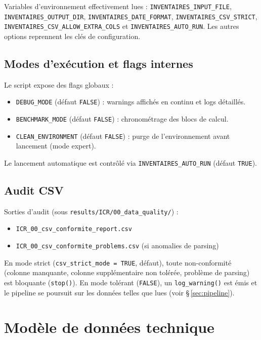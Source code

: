 \documentclass[11pt,a4paper]{article}
\begin{document}
Variables d'environnement effectivement lues : \texttt{INVENTAIRES\_INPUT\_FILE},
\texttt{INVENTAIRES\_OUTPUT\_DIR}, \texttt{INVENTAIRES\_DATE\_FORMAT},
\texttt{INVENTAIRES\_CSV\_STRICT}, \texttt{INVENTAIRES\_CSV\_ALLOW\_EXTRA\_COLS} et
\texttt{INVENTAIRES\_AUTO\_RUN}. Les autres options reprennent les cl\'es de configuration.

\subsection{Modes d'exécution et flags internes}
Le script expose des flags globaux :
\begin{itemize}
  \item \texttt{DEBUG\_MODE} (d\'efaut \texttt{FALSE}) : warnings affich\'es en continu et logs d\'etaill\'es.
  \item \texttt{BENCHMARK\_MODE} (d\'efaut \texttt{FALSE}) : chronom\'etrage des blocs de calcul.
  \item \texttt{CLEAN\_ENVIRONMENT} (d\'efaut \texttt{FALSE}) : purge de l'environnement avant lancement (mode expert).
\end{itemize}

Le lancement automatique est contrôlé via \texttt{INVENTAIRES\_AUTO\_RUN} (défaut \texttt{TRUE}).

\subsection{Audit CSV}
Sorties d'audit (sous \texttt{results/ICR/00\_data\_quality/}) :
\begin{itemize}
  \item \texttt{ICR\_00\_csv\_conformite\_report.csv}
  \item \texttt{ICR\_00\_csv\_conformite\_problems.csv} (si anomalies de parsing)
\end{itemize}

En mode strict (\texttt{csv\_strict\_mode = TRUE}, défaut), toute non-conformité (colonne
manquante, colonne supplémentaire non tolérée, problème de parsing) est bloquante
(\texttt{stop()}). En mode tolérant (\texttt{FALSE}), un \texttt{log\_warning()} est émis et le
pipeline se poursuit sur les données telles que lues (voir \S\,\ref{sec:pipeline}).

\section{Modèle de données technique}
\end{document}
